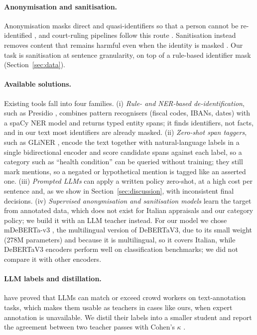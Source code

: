 \documentclass[11pt]{article}
\begin{document}
\paragraph{Anonymisation and sanitisation.} Anonymisation masks direct and quasi-identifiers so that a person cannot be re-identified \citep{lison2021anonymisation,pilan2022tab}, and court-ruling pipelines follow this route \citep{niklaus2023swiss}. Sanitisation instead removes content that remains harmful even when the identity is masked \citep{sanchez2016csanitized}. Our task is sanitisation at sentence granularity, on top of a rule-based identifier mask (Section~\ref{sec:data}).

\paragraph{Available solutions.} Existing tools fall into four families. (i) \emph{Rule- and NER-based de-identification}, such as Presidio \citep{presidio}, combines pattern recognisers (fiscal codes, IBANs, dates) with a spaCy NER model and returns typed entity spans; it finds identifiers, not facts, and in our text most identifiers are already masked. (ii) \emph{Zero-shot span taggers}, such as GLiNER \citep{zaratiana2024gliner}, encode the text together with natural-language labels in a single bidirectional encoder and score candidate spans against each label, so a category such as ``health condition'' can be queried without training; they still mark mentions, so a negated or hypothetical mention is tagged like an asserted one. (iii) \emph{Prompted LLMs} can apply a written policy zero-shot, at a high cost per sentence and, as we show in Section~\ref{sec:discussion}, with inconsistent final decisions. (iv) \emph{Supervised anonymisation and sanitisation models} \citep{pilan2022tab,niklaus2023swiss} learn the target from annotated data, which does not exist for Italian appraisals and our category policy; we build it with an LLM teacher instead. For our model we chose mDeBERTa-v3 \citep{he2023debertav3}, the multilingual version of DeBERTaV3, due to its small weight (278M parameters) and because it is multilingual, so it covers Italian, while DeBERTaV3 encoders perform well on classification benchmarks; we did not compare it with other encoders.

\paragraph{LLM labels and distillation.} \citet{gilardi2023chatgpt} have proved that LLMs can match or exceed crowd workers on text-annotation tasks, which makes them usable as teachers in cases like ours, when expert annotation is unavailable. We distil their labels into a smaller student \citep[in the spirit of][]{hinton2015distilling} and report the agreement between two teacher passes with Cohen's $\kappa$ \citep{cohen1960kappa}.
\end{document}
